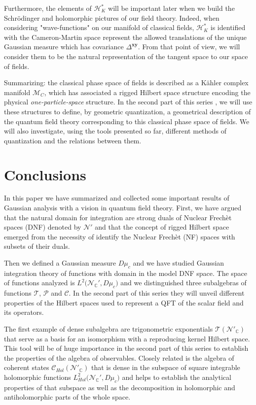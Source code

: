 \documentclass{elsarticle}%
\begin{document}
Furthermore, the elements of $\mathcal{H}_K^*$ will be important later when we build the Schrödinger and holomorphic pictures of our field theory. Indeed, when considering "wave-functions" on our manifold of classical fields, $\mathcal{H}_K^*$ is identified with the Cameron-Martin space represent the allowed translations of the unique Gaussian measure which has covariance $\Delta^{\mathbf{xy}}$. From that point of view, we will consider them to be the natural representation of the tangent space to our space of fields.

Summarizing: the classical phase space of fields is described as a Kähler complex manifold $\mathcal{M}_C$, which has associated a rigged Hilbert space structure encoding the physical \textit{one-particle-space} structure. In the second part of this series \cite{alonsoGeometricFlavours2024}, we will use these structures to define, by geometric quantization, a geometrical description of the quantum field theory corresponding to this  classical phase space of fields. We will also investigate, using the tools presented so far, different methods of quantization and the relations between them.


\section{Conclusions}
\label{sec:conclusions}
 

In this paper we have summarized and collected some important results of Gaussian analysis with a vision in quantum field theory. First, we have argued that the natural domain for integration are strong duals of Nuclear Frechèt spaces (DNF) denoted by $\mathcal{N}'$ and that the concept of rigged Hilbert space emerged from the necessity of identify the Nuclear Frechèt  (NF) spaces with subsets of their duals. 

 Then we defined a Gaussian measure $D\mu_c$ and we have studied Gaussian integration theory of functions with domain in the model DNF space. The space of functions analyzed is $L^2\big({\mathcal{N}_{\mathbb{C}}'}, D\mu_c\big)$ and we distinguished three subalgebras of functions $\mathcal{T}$, $\mathcal{P}$ and $\mathcal{C}$.  In the second part of this series \cite{alonsoGeometricFlavours2024} they will unveil different properties of the Hilbert spaces used to represent a QFT of the scalar field and its operators. 
 
 The first example of dense subalgebra are trigonometric exponentials $\mathcal{T}(\mathcal{N}'_\mathbb{C})$ that serve as a basis for an isomorphism with a reproducing kernel Hilbert space. This tool will be of huge importance in the second part of this series to establish the properties of the algebra of observables. Closely related is the algebra of coherent states $\mathcal{C}_{Hol}(\mathcal{N}'_\mathbb{C})$ that is dense in the subspace of square integrable holomorphic functions $L^2_{Hol}\big({\mathcal{N}_{\mathbb{C}}'}, D\mu_c\big)$ and helps to establish the analytical properties of that subspace as well as the decomposition  in holomorphic and antiholomorphic parts of the whole space.
\end{document}
